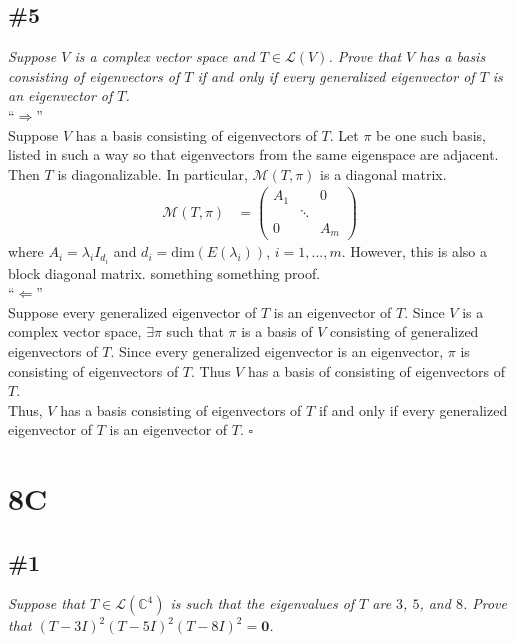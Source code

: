 \documentclass[12pt]{article}
\begin{document}
\subsection*{\#5}
{\it Suppose $V$ is a complex vector space and $T \in \mathcal{L}(V)$.  Prove that $V$ has a basis consisting of eigenvectors of $T$ if and only if every generalized eigenvector of $T$ is an eigenvector of $T$.} \\

\noindent ``$\Longrightarrow$'' \\
Suppose $V$ has a basis consisting of eigenvectors of $T$.  Let $\pi$ be one such basis, listed in such a way so that eigenvectors from the same eigenspace are adjacent.  Then $T$ is diagonalizable.  In particular, $\mathcal{M}(T, \pi)$ is a diagonal matrix.
\begin{align*}
	\mathcal{M}(T, \pi) &= \left(\begin{array}{ccc}
		A_1 & & 0 \\
		 & \ddots & \\
		0 & & A_m
	\end{array}\right)
\end{align*}
where $A_i = \lambda_iI_{d_i}$ and $d_i = \text{dim}(E(\lambda_i))$, $i = 1, \dots, m$.  However, this is also a block diagonal matrix.  {\color{red}something something proof}.\\

\noindent ``$\Longleftarrow$'' \\
Suppose every generalized eigenvector of $T$ is an eigenvector of $T$.  Since $V$ is a complex vector space, $\exists \pi$ such that $\pi$ is a basis of $V$ consisting of generalized eigenvectors of $T$.  Since every generalized eigenvector is an eigenvector, $\pi$ is consisting of eigenvectors of $T$.  Thus $V$ has a basis of consisting of eigenvectors of $T$.\\

\noindent Thus, $V$ has a basis consisting of eigenvectors of $T$ if and only if every generalized eigenvector of $T$ is an eigenvector of $T$. \hfill $\square$

\section*{8C}
\subsection*{\#1}
{\it Suppose that $T \in \mathcal{L}(\mathbb{C}^4)$ is such that the eigenvalues of $T$ are $3$, $5$, and $8$.  Prove that $(T - 3I)^2(T - 5I)^2(T - 8I)^2 = \mathbf{0}$.} \\
\end{document}
